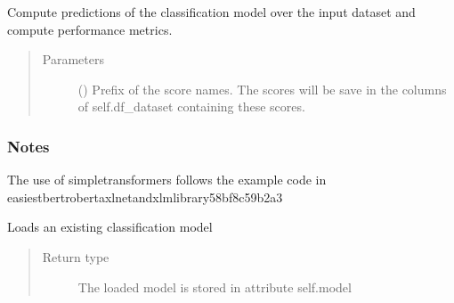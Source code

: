 \documentclass[letterpaper,10pt,english]{sphinxmanual}
\begin{document}
\begin{fulllineitems}
\begin{fulllineitems}
\label{\detokenize{dc_classifier:src.domain_classifier.classifier.CorpusClassifier.eval_model}}
\sphinxAtStartPar
Compute predictions of the classification model over the input dataset
and compute performance metrics.
\begin{quote}\begin{description}
\item[{Parameters}] \leavevmode
\sphinxAtStartPar
{} () \textendash{} Prefix of the score names.
The scores will be save in the columns of self.df\_dataset
containing these scores.

\end{description}\end{quote}
\subsubsection*{Notes}

\sphinxAtStartPar
The use of simpletransformers follows the example code in
\sphinxhyphen{}
easiest\sphinxhyphen{}bert\sphinxhyphen{}roberta\sphinxhyphen{}xlnet\sphinxhyphen{}and\sphinxhyphen{}xlm\sphinxhyphen{}library\sphinxhyphen{}58bf8c59b2a3

\end{fulllineitems}


\begin{fulllineitems}
\label{\detokenize{dc_classifier:src.domain_classifier.classifier.CorpusClassifier.load_model}}
\sphinxAtStartPar
Loads an existing classification model
\begin{quote}\begin{description}
\item[{Return type}] \leavevmode
\sphinxAtStartPar
The loaded model is stored in attribute self.model

\end{description}\end{quote}


\end{fulllineitems}
\end{fulllineitems}
\end{document}
